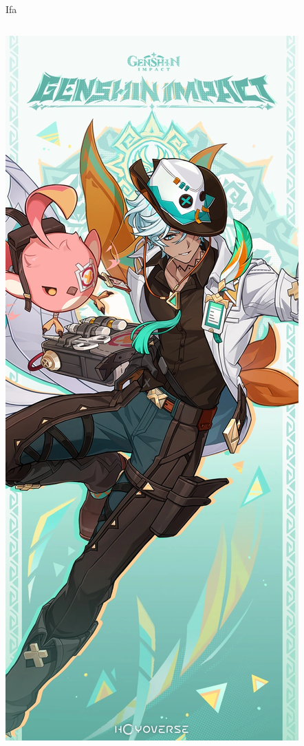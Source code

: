 \documentclass{beamer}
\begin{document}
\begin{frame}{Ifa}
\begin{columns}
\includegraphics[width=\textwidth]{Ifa.png}
\end{columns}
\end{frame}
\end{document}
